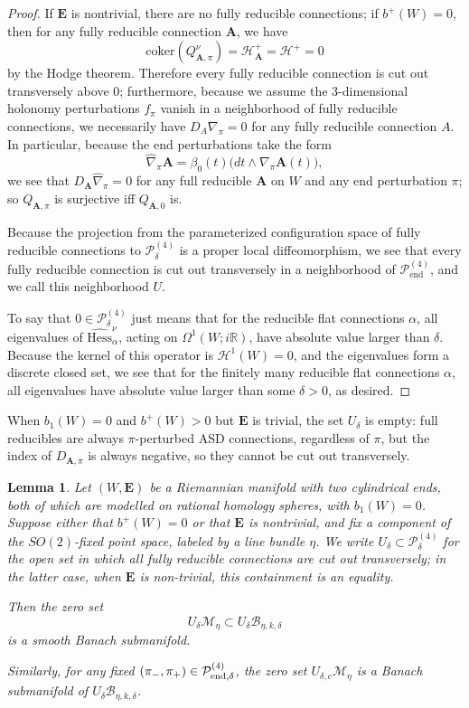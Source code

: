 \documentclass[10pt,a4paper]{amsart}
\newtheorem{lemma}[theorem]{Lemma}
\theoremstyle{definition}
\theoremstyle{remark}
\numberwithin{figure}{qchap}
\begin{document}
\begin{proof}If $\mathbf{E}$ is nontrivial, there are no fully reducible connections; if $b^+(W) = 0$, then for any fully reducible connection $\mathbf{A}$, we have
$$\text{coker}(Q^\nu_{\mathbf{A},\pi}) = \mathcal H^+_{\mathbf{A}} = \mathcal H^+ = 0$$
by the Hodge theorem. Therefore every fully reducible connection is cut out transversely above $0$; furthermore, because we assume the 3-dimensional holonomy perturbations $f_\pi$ vanish in a neighborhood of fully reducible connections, we necessarily have $D_{A}\nabla_\pi = 0$ for any fully reducible connection $A$. 
In particular, because the end perturbations take the form 
$$\widehat{\nabla}_\pi \mathbf{A} = \beta_0(t) \big(dt \wedge \nabla_\pi \mathbf{A}(t)\big),$$
we see that $D_{\mathbf{A}} \widehat{\nabla}_\pi = 0$ for any full reducible $\mathbf{A}$ on $W$ and any end perturbation $\pi$; so $Q_{\mathbf{A},\pi}$ is surjective iff $Q_{\mathbf{A},0}$ is.

Because the projection from the parameterized configuration space of fully reducible connections to $\mathcal P^{(4)}_\delta$ is a proper local diffeomorphism, we see that every fully reducible connection is cut out transversely in a neighborhood of $\mathcal P^{(4)}_{\text{end}}$, and we call this neighborhood $U$.

To say that $0 \in \mathcal P^{(4)}_\delta$ just means that for the reducible flat connections $\alpha$, all eigenvalues of $\widehat{\text{Hess}}^\nu_{\alpha}$, acting on $\Omega^1(W;i\mathbb R)$, have absolute value larger than $\delta$. Because the kernel of this operator is $\mathcal H^1(W) = 0$, and the eigenvalues form a discrete closed set, we see that for the finitely many reducible flat connections $\alpha$, all eigenvalues have absolute value larger than some $\delta > 0$, as desired.
\end{proof}

When $b_1(W) = 0$ and $b^+(W) > 0$ but $\mathbf{E}$ is trivial, the set $U_{\delta}$ is empty: full reducibles are always $\pi$-perturbed ASD connections, regardless of $\pi$, but the index of $D_{\mathbf{A},\pi}$ is always negative, so they cannot be cut out transversely.

\begin{lemma}\label{zero-Banach}Let $(W,\mathbf{E})$ be a Riemannian manifold with two cylindrical ends, both of which are modelled on rational homology spheres, with $b_1(W) = 0$. Suppose either that $b^+(W) = 0$ or that $\mathbf{E}$ is nontrivial, and fix a component of the $SO(2)$-fixed point space, labeled by a line bundle $\eta$. We write $U_\delta \subset \mathcal P^{(4)}_\delta$ for the open set in which all fully reducible connections are cut out transversely; in the latter case, when $\mathbf{E}$ is non-trivial, this containment is an equality.

Then the zero set $$U_\delta \mathcal M_{\eta} \subset U_\delta \mathcal B_{\eta,k,\delta}$$ is a smooth Banach submanifold.

Similarly, for any fixed $(\pi_-, \pi_+) \in \mathcal P^{(4)}_{\textup{end},\delta}$, the zero set $U_{\delta, c} \mathcal M_\eta$ is a Banach submanifold of $U_\delta \mathcal B_{\eta, k, \delta}$. 
\end{lemma}
\end{document}
